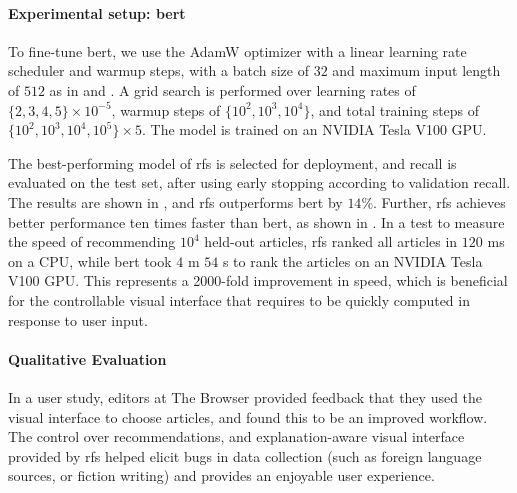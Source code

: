 \paragraph{Experimental setup: \acrshort{bert}} To fine-tune \acrshort{bert}, we use the AdamW optimizer with a linear learning rate scheduler and warmup steps, with a batch size of $32$ and maximum input length of $512$ as in \textcite{devlin2019bert:} and \textcite{wolf2019huggingfaces}. A grid search is performed over learning rates of $\{2, 3, 4, 5\} \times 10^{-5}$, warmup steps of $\{10^2, 10^3, 10^4\}$, and total training steps of $\{10^2, 10^3, 10^4, 10^5\} \times 5$. The model is trained on an NVIDIA Tesla V100 GPU.

The best-performing model of \gls{rfs} is selected for deployment, and recall is evaluated on the test set, after using early stopping according to validation recall. The results are shown in , and \gls{rfs} outperforms \acrshort{bert} by $14\%$. Further, \gls{rfs} achieves better performance ten times faster than \acrshort{bert}, as shown in . In a test to measure the speed of recommending $10^4$ held-out articles, \gls{rfs} ranked all articles in $120$ ms on a CPU, while \acrshort{bert} took $4$ m $54$ s to rank the articles on an NVIDIA Tesla V100 GPU. This represents a 2000-fold improvement in speed, which is beneficial for the controllable visual interface that requires  to be quickly computed in response to user input.




\paragraph{Qualitative Evaluation} In a user study, editors at The Browser provided feedback that they used the visual interface to choose articles, and found this to be an improved workflow. The control over recommendations, and explanation-aware visual interface provided by \gls{rfs} helped elicit bugs in data collection (such as foreign language sources, or fiction writing) and provides an enjoyable user experience.